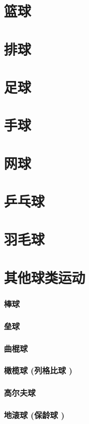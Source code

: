 \documentclass[UTF8]{../../ApplicationUniverse}
\begin{document}
\section{篮球}
\section{排球}
\section{足球}
\section{手球}
\section{网球}
\section{乒乓球}
\section{羽毛球}
\section{其他球类运动}
    \subsubsection{棒球}
    \subsubsection{垒球}
    \subsubsection{曲棍球}
    \subsubsection{橄榄球 (列格比球 )}
    \subsubsection{高尔夫球}
    \subsubsection{地滚球 (保龄球 )}
\end{document}
